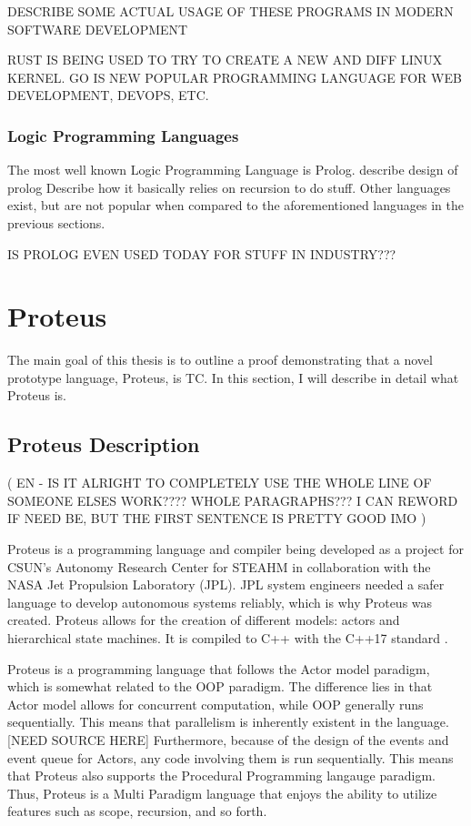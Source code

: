 DESCRIBE SOME ACTUAL USAGE OF THESE PROGRAMS IN MODERN SOFTWARE DEVELOPMENT

RUST IS BEING USED TO TRY TO CREATE A NEW AND DIFF LINUX KERNEL.
GO IS NEW POPULAR PROGRAMMING LANGUAGE FOR WEB DEVELOPMENT, DEVOPS, ETC.


\subsubsection{Logic Programming Languages}

The most well known Logic Programming Language is Prolog.
describe design of prolog
Describe how it basically relies on recursion to do stuff.
Other languages exist, but are not popular when compared to the aforementioned languages in the previous sections.

IS PROLOG EVEN USED TODAY FOR STUFF IN INDUSTRY???


\section{Proteus}\label{sec:Proteus}

The main goal of this thesis is to outline a proof demonstrating that a novel prototype language, Proteus, is TC.
In this section, I will describe in detail what Proteus is.

\subsection{Proteus Description}\label{subsec:ProteusDescription}

(
EN - IS IT ALRIGHT TO COMPLETELY USE THE WHOLE LINE OF SOMEONE ELSES WORK???? WHOLE PARAGRAPHS???
I CAN REWORD IF NEED BE, BUT THE FIRST SENTENCE IS PRETTY GOOD IMO
)

Proteus is a programming language and compiler being developed as a project for CSUN's Autonomy Research Center for STEAHM in collaboration with the NASA Jet Propulsion Laboratory (JPL).
JPL system engineers needed a safer language to develop autonomous systems reliably, which is why Proteus was created.
Proteus allows for the creation of different models: actors and hierarchical state machines.
It is compiled to C++ with the C++17 standard \cite{ProteusRunTime}.

Proteus is a programming language that follows the Actor model paradigm, which is somewhat related to the OOP paradigm.
The difference lies in that Actor model allows for concurrent computation, while OOP generally runs sequentially.
This means that parallelism is inherently existent in the language.
[NEED SOURCE HERE]
Furthermore, because of the design of the events and event queue for Actors, any code involving them is run sequentially.
This means that Proteus also supports the Procedural Programming langauge paradigm.
Thus, Proteus is a Multi Paradigm language that enjoys the ability to utilize features such as scope, recursion, and so forth.

